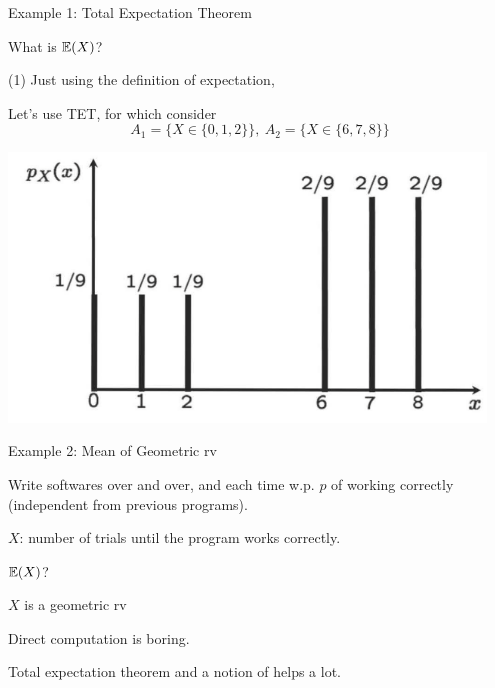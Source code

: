 \begin{frame}{Example 1: Total Expectation Theorem}

{
\plitemsep 0.1in
\bci 

\item \question What is $\mathbb{E}( X )$?
\item[(1)] Just using the definition of expectation,


\item<3->[(2)] Let's use TET, for which consider
$$A_1 = \{X \in \{0,1,2\} \}, \ A_2 = \{ X \in \{6,7,8\} \}$$ 


\eci 
}
{
\centering
\includegraphics[width=0.95\textwidth]{L3_total_exp_ex.png}
}

\end{frame}

\begin{frame}{Example 2: Mean of Geometric rv}

\plitemsep 0.1in
\bci 

\item<1-> Write softwares over and over, and each time w.p. $p$ of working correctly (independent from previous programs). 

\item<2-> $X$: number of trials until the program works correctly. 

\item<3->  $\mathbb{E}( X )$?

\item<4-> $X$ is a geometric rv

\item<5-> Direct computation is boring.

\item<6-> Total expectation theorem and a notion of  helps a lot. 
\eci

\end{frame}

